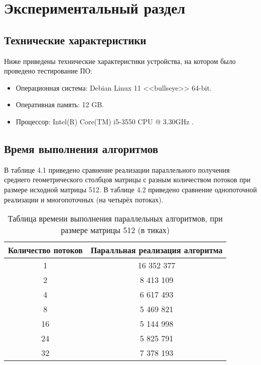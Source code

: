 \chapter{Экспериментальный раздел}
\label{cha:research}
    
    \section{Технические характеристики}
    
    Ниже приведены технические характеристики устройства, на котором было проведено тестирование ПО:
    
    \begin{itemize}
    	\item Операционная система: Debian \cite{debian} Linux \cite{linux} 11 <<bullseye>> 64-bit.
    	\item Оперативная память: 12 GB.
    	\item Процессор: Intel(R) Core(TM) i5-3550 CPU @ 3.30GHz
    \cite{i5}.
    
    \end{itemize}
    
    \section{Время выполнения алгоритмов}
    В таблице 4.1 приведено сравнение реализации параллельного получения среднего геометрического столбцов матрицы с разным количеством потоков при размере исходной матрицы 512. В таблице 4.2 приведено сравнение однопоточной реализации и многопоточных (на четырёх потоках).
    
    \begin{table} [h!]
    	\caption{Таблица времени выполнения параллельных алгоритмов, при размере матрицы 512 (в тиках)}
    	\begin{center}
    		\begin{tabular}{|c c|} 
    			\hline
    			Количество потоков & Паралльная реализация алгоритма \\
    			\hline
    			1 & 16 352 377\\
    			\hline
    			2 & 8 413 109\\
    			\hline
    			4 & 6 617 493\\
    			\hline
    			8 & 5 469 821 \\
    			\hline
    			16 & 5 144 998 \\
    			\hline
    			24 & 5 825 791 \\
    			\hline
    			32 & 7 378 193 \\
    			\hline
    		\end{tabular}
    	\end{center}
    \end{table}
    
